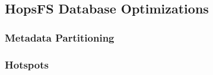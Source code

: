 \subsection{HopsFS Database Optimizations}
\subsubsection{Metadata Partitioning}
\subsubsection{Hotspots}